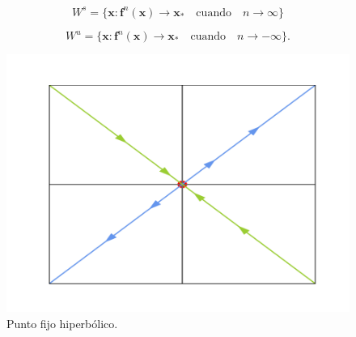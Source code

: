 \documentclass[11pt]{beamer}
\theoremstyle{definition}
\begin{document}
\begin{frame}
\begin{definition}
\begin{equation}
W^{s}=\lbrace \mathbf{x} : \mathbf{f}^{n}(\mathbf{x})\rightarrow \mathbf{x}_{*} \quad \mathrm{cuando} \quad n\rightarrow \infty \rbrace
\label{variedad estable}
\end{equation}

\begin{equation}
W^{u}=\lbrace \mathbf{x} : \mathbf{f}^{n}(\mathbf{x})\rightarrow \mathbf{x}_{*} \quad \mathrm{cuando} \quad n\rightarrow -\infty \rbrace.
\label{variedad inestable}
\end{equation}

\end{definition}

\begin{figure}
\centering
\includegraphics[scale=0.4]{hyperbolic2.pdf}
\caption{Punto fijo hiperb\'olico.}
\label{hiperbolico}
\end{figure}

\end{frame}
\end{document}
